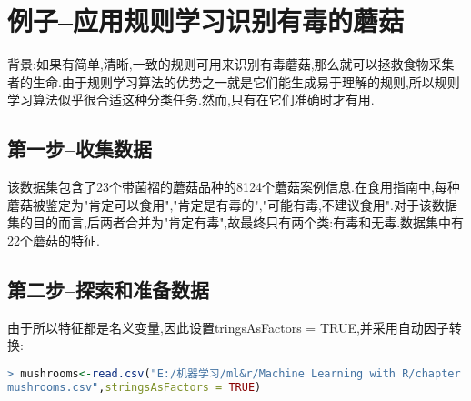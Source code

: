 \documentclass[11pt,a4paper,oneside]{book}
\begin{document}
\section{例子--应用规则学习识别有毒的蘑菇}
背景:如果有简单,清晰,一致的规则可用来识别有毒蘑菇,那么就可以拯救食物采集者的生命.由于规则学习算法的优势之一就是它们能生成易于理解的规则,所以规则学习算法似乎很合适这种分类任务.然而,只有在它们准确时才有用.
\subsection{第一步--收集数据}
该数据集包含了23个带菌褶的蘑菇品种的8124个蘑菇案例信息.在食用指南中,每种蘑菇被鉴定为"肯定可以食用","肯定是有毒的","可能有毒,不建议食用".对于该数据集的目的而言,后两者合并为"肯定有毒",故最终只有两个类:有毒和无毒.数据集中有22个蘑菇的特征.
\subsection{第二步--探索和准备数据}
由于所以特征都是名义变量,因此设置tringsAsFactors = TRUE,并采用自动因子转换:
\begin{lstlisting}[language=r]
> mushrooms<-read.csv("E:/机器学习/ml&r/Machine Learning with R/chapter 5/
mushrooms.csv",stringsAsFactors = TRUE)
\end{lstlisting}
\end{document}
